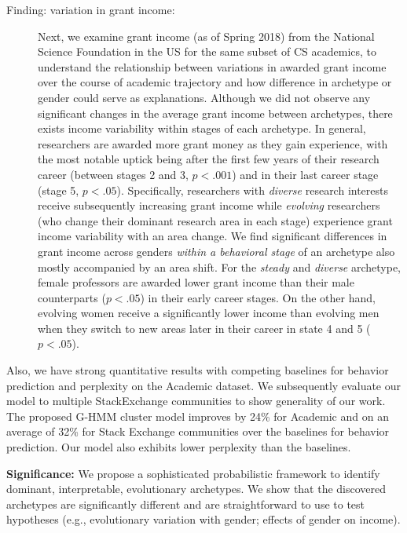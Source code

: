 \begin{description}
\item[ Finding: variation in grant income:]  Next, we examine grant income (as of Spring 2018) from the National Science Foundation in the US for the same subset of CS academics, to understand the relationship between variations in awarded grant income over the course of academic trajectory and how difference in archetype or gender could serve as explanations.
Although we did not observe any significant changes in the average grant income between archetypes, there exists income variability within stages of each archetype.
In general, researchers are awarded more grant money as they gain experience, with the most notable uptick being after the first few years of their research career (between stages 2 and 3, $p< .001$) and in their last career stage (stage 5, $p< .05$).
Specifically, researchers with \emph{diverse} research interests receive subsequently increasing grant income while \emph{evolving} researchers (who change their dominant research area in each stage) experience grant income variability with an area change.
We find significant differences in grant income across genders \textit{within a behavioral stage} of an archetype also mostly accompanied by an area shift. For the \textit{steady} and \textit{diverse} archetype, female professors are awarded lower grant income than their male counterparts ($p< .05$) in their early career stages. On the other hand, evolving women receive a significantly lower income than evolving men when they switch to new areas later in their career in state 4 and 5 ($p < .05$).
\end{description}

Also, we have strong quantitative results with competing baselines for behavior prediction and perplexity on the Academic dataset.
We subsequently evaluate our model to multiple StackExchange communities to show generality of our work.
The proposed G-HMM cluster model improves by 24\% for Academic and on an average of 32\% for Stack Exchange communities over the baselines for behavior prediction.
Our model also exhibits lower perplexity than the baselines.

\textbf{Significance:} We propose a sophisticated probabilistic framework to identify dominant, interpretable, evolutionary archetypes. We show that the discovered archetypes are significantly different and are straightforward to use to test hypotheses (e.g., evolutionary variation with gender; effects of gender on income). 
